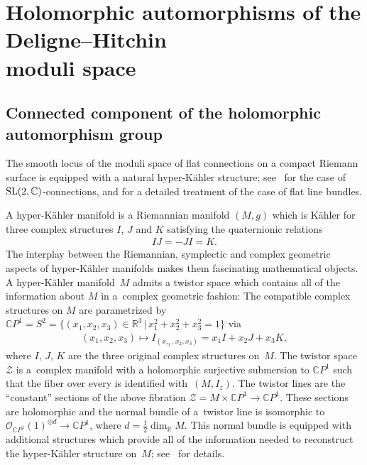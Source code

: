 \section[Holomorphic automorphisms of the Deligne--Hitchin moduli space]{Holomorphic automorphisms of the Deligne--Hitchin\\ moduli space}

\subsection{Connected component of the holomorphic automorphism group}\label{aut0mdh}

The smooth locus of the moduli space of f\/lat connections on a compact Riemann surface is equipped with a natural hyper-K\"ahler structure; see~\cite{H} for the case of ${\rm SL}(2,\mathbb C)$-connections, and \cite{GX} for a detailed treatment of the case of f\/lat line bundles.

A hyper-K\"ahler manifold is a Riemannian manifold $(M, g)$ which is K\"ahler for three complex structures $I$, $J$ and $K$ satisfying the quaternionic relations
\begin{gather*}IJ = -JI = K .\end{gather*} The interplay between the Riemannian, symplectic and complex geometric aspects of hyper-K\"ahler manifolds makes them fascinating mathematical objects. A hyper-K\"ahler mani\-fold~$M$ admits a twistor space which contains all of the information about $M$ in a~complex geometric fashion: The compatible complex structures on $M$ are parametrized by $\mathbb CP^1 = S^2 = \big\{(x_1, x_2, x_3) \in {\mathbb R}^3 \,|\, x^2_1+x^2_2+x^2_3 = 1\big\}$ via
\begin{gather*}(x_1, x_2, x_3) \longmapsto I_{(x,_1,x_2,x_3)} = x_1 I+x_2 J+x_3 K ,\end{gather*}
where $I$, $J$, $K$ are the three original complex structures on~$M$. The twistor space $\mathcal Z$ is a~complex manifold with a holomorphic surjective submersion to $\mathbb CP^1$ such that the f\/iber over every  is identif\/ied with~$(M, I_z)$. The twistor lines are the ``constant'' sections of the above f\/ibration ${\mathcal Z} = M\times\mathbb CP^1 \longrightarrow {\mathbb C} P^1$. These sections are holomorphic and the normal bundle of a~twistor line is isomorphic to ${\mathcal O}_{\mathbb CP^1}(1)^{\oplus d} \longrightarrow \mathbb CP^1$, where $d = \frac{1}{2}\dim_{\mathbb R}M$. This normal bundle is equipped with additional structures which provide all of the information needed to reconstruct the hyper-K\"ahler structure on~$M$; see~\cite{HKLR} for details.

